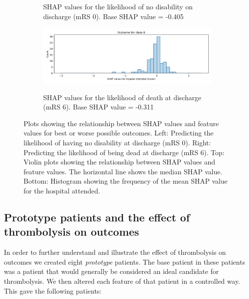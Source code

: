 \begin{figure}
\begin{subfigure}{.5\textwidth}
      \caption{\footnotesize{SHAP values for the likelihood of no disability on discharge (mRS 0). Base SHAP value = -0.405}}
      \label{fig:mrs0_violin}
    \end{subfigure}%
    \begin{subfigure}{.5\textwidth}
      \centering
      \captionsetup{width=.9\linewidth}
      \includegraphics[trim={0 0 0 1cm}, clip, width=1\linewidth]
        {./images/053_xgb_7_features_1fold_hosp_shap_hist_mrs6}\\
      \caption{\footnotesize{SHAP values for the likelihood of death at discharge (mRS 6). Base SHAP value = -0.311}}
      \label{fig:mrs6_violin}
    \end{subfigure}
  \caption{Plots showing the relationship between SHAP values and feature values for best or worse possible outcomes. Left: Predicting the likelihood of having no disability at discharge (mRS 0). Right: Predicting the likelihood of being dead at discharge (mRS 6). Top: Violin plots showing the relationship between SHAP values and feature values. The horizontal line shows the median SHAP value. Bottom: Histogram showing the frequency of the mean SHAP value for the hospital attended.}
    \label{fig:shap_outcome_model}
\end{figure}



\subsection{Prototype patients and the effect of thrombolysis on outcomes}

In order to further understand and illustrate the effect of thrombolysis on outcomes we created eight \textit{prototype} patients. The base patient in these patients was a patient that would generally be considered an ideal candidate for thrombolysis. We then altered each feature of that patient in a controlled way. This gave the following patients:

